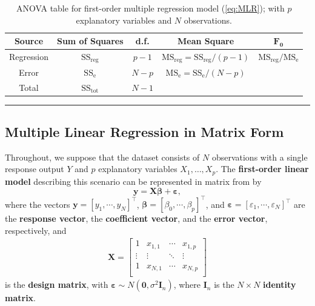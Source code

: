  \begin{table}[!t]
         \centering
         \begin{tabular}{c c c c c}
         \hline
        \textbf{Source} & \textbf{Sum of Squares} & \textbf{d.f.} & \textbf{Mean Square} & $\mathbf{F_{0}}$ \\
         \hline
         Regression & $\text{SS}_{\textrm{reg}}$ & $p-1$ & $\text{MS}_{\textrm{reg}}=\text{SS}_{\textrm{reg}}/(p-1)$ & $\text{MS}_{\textrm{reg}}/\text{MS}_{\textrm{e}}$\\
         Error & $\text{SS}_{\textrm{e}}$ & $N-p$ & $\text{MS}_{\textrm{e}}=\text{SS}_{\textrm{e}}/(N-p)$ \\
         Total & $\text{SS}_{\textrm{tot}}$ & $N-1$\\
        \hline
         \end{tabular}
         \caption[\small ANOVA table for first-order multiple regression]{\small ANOVA table for first-order multiple regression model (\ref{eq:MLR}); with $p$ explanatory variables and $N$ observations. }
         \label{tab:SA4}\hrule
     \end{table}
\subsection{Multiple Linear Regression in Matrix Form}
Throughout, we suppose that the dataset consists of $N$ observations with a single response output $Y$ and $p$ explanatory variables $X_1,\ldots,X_p$. The \textbf{first-order linear model} describing this scenario can be represented in matrix from by 
\begin{equation}\label{eq:MLR}
    \bm{y}=\bm{X\beta}+\bm{\varepsilon},
\end{equation}
where the vectors $\bm{y}=[y_{1},\cdots,y_{N}]^{\!\top}$, $\bm{\beta}=[\beta_{0},\cdots,\beta_{p}]^{\!\top}$, and $\bm{\varepsilon}=[\varepsilon_{1},\cdots,\varepsilon_{N}]^{\!\top}$ are the \textbf{response vector},  the \textbf{coefficient vector}, and  the \textbf{error vector}, respectively, and 
\begin{gather*}
 \bm{X} =  
    \begin{bmatrix}
    1 & x_{1,1} & \cdots & x_{1,p}\\
    \vdots & \vdots & \ddots & \vdots\\
    1 & x_{N,1} & \cdots & x_{N,p}\\
    \end{bmatrix}  
\end{gather*}
is the \textbf{design matrix}, with $\bm{\varepsilon}\sim N(\bm{0}, \sigma^{2}\bm{I}_n)$, where $\bm{I}_n$ is the $N \times N$ \textbf{identity matrix}. 
 
